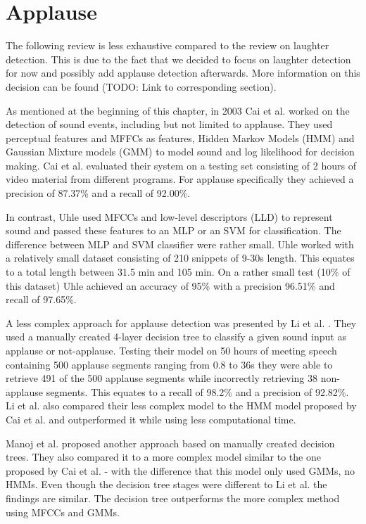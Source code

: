 \documentclass[bsc,frontabs,parskip,deptreport]{infthesis}
\begin{document}
\section{Applause}
The following review is less exhaustive compared to the review on laughter detection.
This is due to the fact that we decided to focus on laughter detection for now and possibly add applause detection afterwards.
More information on this decision can be found (TODO: Link to corresponding section).

As mentioned at the beginning of this chapter, in 2003 Cai et al. \cite{cai2003highlight} worked on the detection of sound events, including but not limited to applause.
They used perceptual features and MFFCs as features, Hidden Markov Models (HMM) and Gaussian Mixture models (GMM) to model sound and log likelihood for decision making.
Cai et al. evaluated their system on a testing set consisting of 2 hours of video material from different programs.
For applause specifically they achieved a precision of 87.37\% and a recall of 92.00\%.

In contrast, Uhle \cite{uhle2011applause} used MFCCs and low-level descriptors (LLD) to represent sound and passed these features to an MLP or an SVM for classification.
The difference between MLP and SVM classifier were rather small.
Uhle worked with a relatively small dataset consisting of 210 snippets of 9-30s length. This equates to a total length between 31.5 min and 105 min.
On a rather small test (10\% of this dataset) Uhle achieved an accuracy of 95\% with a precision 96.51\% and recall of 97.65\%.

A less complex approach for applause detection was presented by Li et al. \cite{li2009characteristics}.
They used a manually created 4-layer decision tree to classify a given sound input as applause or not-applause.
Testing their model on 50 hours of meeting speech containing 500 applause segments ranging from 0.8 to 36s they were able to retrieve 491 of the 500 applause segments while incorrectly retrieving 38 non-applause segments.
This equates to a recall of 98.2\% and a precision of 92.82\%. Li et al. also compared their less complex model to the HMM model proposed by Cai et al.\cite{cai2003highlight} and outperformed it while using less computational time.

Manoj et al. \cite{manoj2011novel} proposed another approach based on manually created decision trees. They also compared it to a more complex model similar to the one proposed by Cai et al. \cite{cai2003highlight} - with the difference that this model only used GMMs, no HMMs.
Even though the decision tree stages were different to Li et al. \cite{li2009characteristics} the findings are similar. The decision tree outperforms the more complex method using MFCCs and GMMs.  
\end{document}
